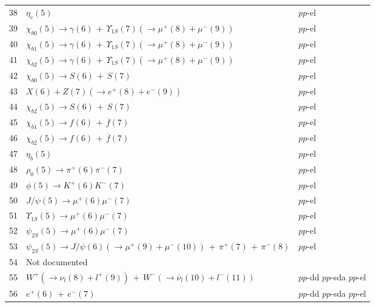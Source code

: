 \documentclass{article}
\begin{document}
\begin{center}
\begin{tabular}{|c|l|l|}
38 & $\eta_c(5)$ &  $pp$-el  \\

39 & $\chi_{b0}(5)\to \gamma(6)\,+\,\Upsilon_{1S}(7)(\to \mu^+(8)+\mu^-(9))$ &  $pp$-el  \\

40 & $\chi_{b1}(5)\to \gamma(6)\,+\,\Upsilon_{1S}(7)(\to \mu^+(8)+\mu^-(9))$ &  $pp$-el  \\

41 & $\chi_{b2}(5)\to \gamma(6)\,+\,\Upsilon_{1S}(7)(\to \mu^+(8)+\mu^-(9))$ &  $pp$-el  \\

42 & $\chi_{b0}(5)\to S(6)\,+\,S(7)$ &  $pp$-el  \\

43 & $X(6) + Z(7)(\to e^+ (8)+ e^- (9))$ &  $pp$-el  \\

44 & $\chi_{b2}(5)\to S(6)\,+\,S(7)$ &  $pp$-el  \\

45 & $\chi_{b1}(5)\to f(6)\,+\,\overline{f}(7)$ &  $pp$-el  \\

46 & $\chi_{b2}(5)\to f(6)\,+\,\overline{f}(7)$ &  $pp$-el  \\

47 &  $\eta_b(5)$ &  $pp$-el  \\

48 & $\rho_0(5)\to \pi^+(6)\pi^-(7)$ &  $pp$-el  \\

49 & $\phi(5)\to K^+(6)K^-(7)$ &  $pp$-el  \\

50 & $J/\psi(5)\to \mu^+(6)\mu^-(7)$ &  $pp$-el  \\

51 & $\Upsilon_{1S}(5)\to \mu^+(6)\mu^-(7)$ &  $pp$-el  \\

52 & $\psi_{2S}(5)\to \mu^+(6)\mu^-(7)$ &  $pp$-el  \\

53 & $\psi_{2S}(5)\to J/\psi(6)(\to\mu^+(9)+\mu^-(10))\,+\,\pi^+(7)\,+\,\pi^-(8)$ &  $pp$-el  \\

54 & Not documented &  \\

55 & $W^+(\to \nu_l(8)+l^+(9))\,+\, W^-(\to \overline{\nu}_l(10)+l^-(11))$ &  $pp$-dd  $pp$-sda  $pp$-el  \\

56 & $e^+(6)\,+\,e^-(7)$ &  $pp$-dd  $pp$-sda  $pp$-el  \\


\end{tabular}
\end{center}
\end{document}

